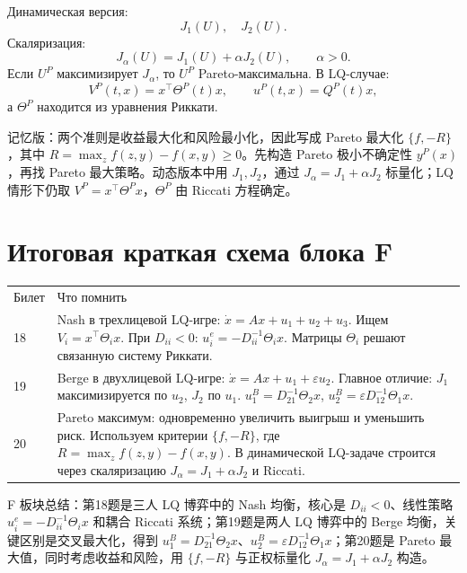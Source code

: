 \documentclass[12pt,a4paper]{article}
\newcommand{\zh}[1]{\par\noindent #1\par}
\begin{document}
Динамическая версия:
\[
J_1(U),\quad J_2(U).
\]
Скаляризация:
\[
J_\alpha(U)=J_1(U)+\alpha J_2(U),\qquad \alpha>0.
\]
Если \(U^P\) максимизирует \(J_\alpha\), то \(U^P\) Pareto-максимальна.
В LQ-случае:
\[
V^P(t,x)=x^{\top}\Theta^P(t)x,
\qquad u^P(t,x)=Q^P(t)x,
\]
а \(\Theta^P\) находится из уравнения Риккати.
\zh{记忆版：两个准则是收益最大化和风险最小化，因此写成 Pareto 最大化 \(\{f,-R\}\)，其中 \(R=\max_z f(z,y)-f(x,y)\ge0\)。先构造 Pareto 极小不确定性 \(y^P(x)\)，再找 Pareto 最大策略。动态版本中用 \(J_1,J_2\)，通过 \(J_\alpha=J_1+\alpha J_2\) 标量化；LQ 情形下仍取 \(V^P=x^\top\Theta^P x\)，\(\Theta^P\) 由 Riccati 方程确定。}

\section*{Итоговая краткая схема блока F}
\begin{center}
\begin{tabular}{p{2cm}p{12cm}}
Билет & Что помнить \\
18 & Nash в трехлицевой LQ-игре: \(\dot x=Ax+u_1+u_2+u_3\). Ищем \(V_i=x^{\top}\Theta_i x\). При \(D_{ii}<0\): \(u_i^e=-D_{ii}^{-1}\Theta_i x\). Матрицы \(\Theta_i\) решают связанную систему Риккати. \\
19 & Berge в двухлицевой LQ-игре: \(\dot x=Ax+u_1+\varepsilon u_2\). Главное отличие: \(J_1\) максимизируется по \(u_2\), \(J_2\) по \(u_1\). \(u_1^B=D_{21}^{-1}\Theta_2x\), \(u_2^B=\varepsilon D_{12}^{-1}\Theta_1x\). \\
20 & Pareto максимум: одновременно увеличить выигрыш и уменьшить риск. Используем критерии \(\{f,-R\}\), где \(R=\max_z f(z,y)-f(x,y)\). В динамической LQ-задаче строится через скаляризацию \(J_\alpha=J_1+\alpha J_2\) и Riccati. \\
\end{tabular}
\end{center}
\zh{F 板块总结：第18题是三人 LQ 博弈中的 Nash 均衡，核心是 \(D_{ii}<0\)、线性策略 \(u_i^e=-D_{ii}^{-1}\Theta_i x\) 和耦合 Riccati 系统；第19题是两人 LQ 博弈中的 Berge 均衡，关键区别是交叉最大化，得到 \(u_1^B=D_{21}^{-1}\Theta_2x\)、\(u_2^B=\varepsilon D_{12}^{-1}\Theta_1x\)；第20题是 Pareto 最大值，同时考虑收益和风险，用 \(\{f,-R\}\) 与正权标量化 \(J_\alpha=J_1+\alpha J_2\) 构造。}
\end{document}
